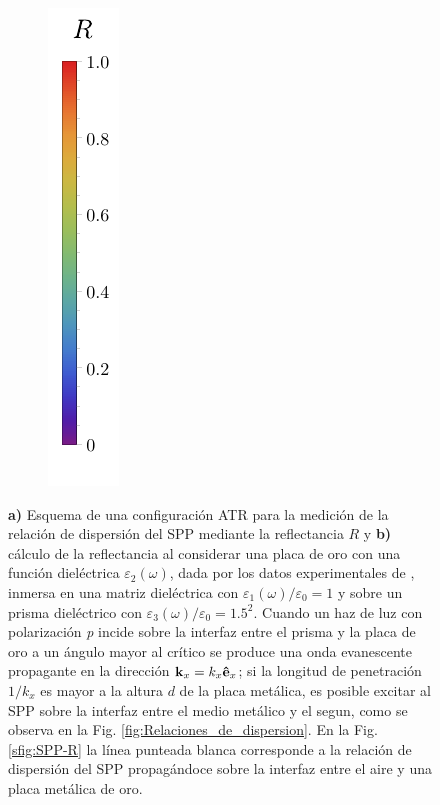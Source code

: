 \begin{figure}[h!]
\begin{subfigure}{.45\linewidth}
	\includegraphics[scale=.73, trim={00 -15 00 00}, clip]{2-Resultados/figs/0-RBar_v}
	\end{subfigure}\hfill	\vspace*{-.7em}
	\caption{\textbf{a)} Esquema de una configuración ATR para la medición de la relación de dispersión del SPP mediante la reflectancia $R$ y \textbf{b)}  cálculo de la reflectancia al considerar una placa de oro con una función dieléctrica $\varepsilon_2(\omega)$, dada por los datos experimentales de \cite{johnson1972constants},	inmersa en una matriz dieléctrica con $\varepsilon_1(\omega)/\varepsilon_0 = 1$ y sobre un prisma dieléctrico con $\varepsilon_3(\omega)/\varepsilon_0=1.5^2$. Cuando un haz de luz con polarización \emph{p} incide sobre la interfaz entre el prisma y la placa de oro a un ángulo mayor al crítico se produce una onda evanescente propagante en la dirección $\vb{k}_x=k_x\vu{e}_x$; si la longitud de penetración $1/k_x$ es mayor a la altura $d$ de la placa metálica, es posible excitar al SPP sobre la interfaz entre el medio metálico y el segun, como se observa en la Fig. \ref{fig:Relaciones_de_dispersion}. En la Fig. \ref{sfig:SPP-R} la línea punteada blanca corresponde a la relación de dispersión del SPP propagándoce sobre la interfaz entre el aire y una placa metálica de oro.}\label{fig:ATR-SPP}
	\end{figure}			
		
